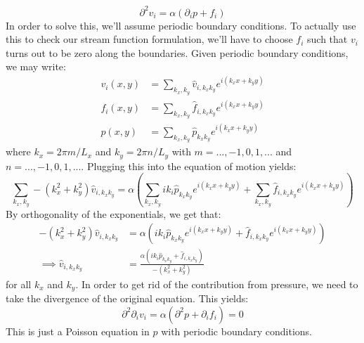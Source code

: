 \documentclass[reqno]{article}
\begin{document}
	\begin{equation}\label{eq:fluid-laplace-equation}
		\partial^2 v_i = \alpha \left( \partial_i p + f_i \right)
	\end{equation}
	In order to solve this, we'll assume periodic boundary conditions. 
	To actually use this to check our stream function formulation, we'll have to choose $f_i$ such that $v_i$ turns out to be zero along the boundaries. 
	Given periodic boundary conditions, we may write:
	\begin{align}
		v_i (x, y) &= \sum_{k_x, k_y} \hat{v}_{i, k_x k_y} 
		e^{ i \left( k_x x + k_y y \right) } \\
		f_i (x, y) &= \sum_{k_x, k_y} \hat{f}_{i, k_x k_y}
		e^{ i \left( k_x x + k_y y \right) } \\
		p (x, y) &= \sum_{k_x, k_y} \hat{p}_{k_x k_y}
		e^{ i \left( k_x x + k_y y \right) }
	\end{align}
	where $k_x = 2\pi m/L_x$ and $k_y = 2\pi n/L_y$ with $m = ..., -1, 0, 1, ...$ and $n = ..., -1, 0, 1, ...$.
	Plugging this into the equation of motion yields:
	\begin{equation}
		\sum_{k_x, k_y} - \left( k_x^2 + k_y^2 \right) \hat{v}_{i, k_x k_y} =
		\alpha \left( 
		\sum_{k_x, k_y} i k_i \hat{p}_{k_x k_y}
		e^{ i \left( k_x x + k_y y \right) }
		+ \sum_{k_x, k_y} \hat{f}_{i, k_x k_y}
		e^{ i \left( k_x x + k_y y \right) }
		\right)
	\end{equation}
	By orthogonality of the exponentials, we get that:
	\begin{equation}
	\begin{split}
		- \left( k_x^2 + k_y^2 \right) \hat{v}_{i, k_x k_y} 
		&= \alpha \left( 
		i k_i \hat{p}_{k_x k_y}
		e^{ i \left( k_x x + k_y y \right) }
		+ \hat{f}_{i, k_x k_y}
		e^{ i \left( k_x x + k_y y \right) }
		\right) \\
		\implies
		\hat{v}_{i, k_x k_y}
		&= \frac{ \alpha \left(
		i k_i \hat{p}_{k_x k_y}
		+ \hat{f}_{i, k_x k_y} 
		\right) }
		{ - \left( k_x^2 + k_y^2 \right) }
	\end{split}
	\end{equation}
	for all $k_x$ and $k_y$. 
	In order to get rid of the contribution from pressure, we need to take the divergence of the original equation.
	This yields:
	\begin{equation}
		\partial^2 \partial_i v_i
		= \alpha \left(
		\partial^2 p + \partial_i f_i
		\right)
		= 0
	\end{equation}
	This is just a Poisson equation in $p$ with periodic boundary conditions.
\end{document}
